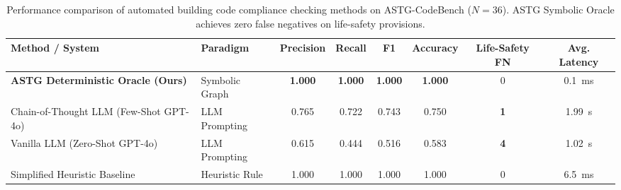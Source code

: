 \begin{table}[t]
\centering
\small
\caption{Performance comparison of automated building code compliance checking methods on ASTG-CodeBench ($N=36$). ASTG Symbolic Oracle achieves zero false negatives on life-safety provisions.}
\label{tab:baseline_comparison}
\begin{tabular}{llcccccc}
\toprule
\textbf{Method / System} & \textbf{Paradigm} & \textbf{Precision} & \textbf{Recall} & \textbf{F1} & \textbf{Accuracy} & \textbf{Life-Safety FN} & \textbf{Avg. Latency} \\
\midrule
\textbf{ASTG Deterministic Oracle (Ours)} & Symbolic Graph & \textbf{1.000} & \textbf{1.000} & \textbf{1.000} & \textbf{1.000} & 0 & 0.1~ms \\
Chain-of-Thought LLM (Few-Shot GPT-4o) & LLM Prompting & 0.765 & 0.722 & 0.743 & 0.750 & \textbf{1} & 1.99~s \\
Vanilla LLM (Zero-Shot GPT-4o) & LLM Prompting & 0.615 & 0.444 & 0.516 & 0.583 & \textbf{4} & 1.02~s \\
Simplified Heuristic Baseline & Heuristic Rule & 1.000 & 1.000 & 1.000 & 1.000 & 0 & 6.5~ms \\
\bottomrule
\end{tabular}
\end{table}